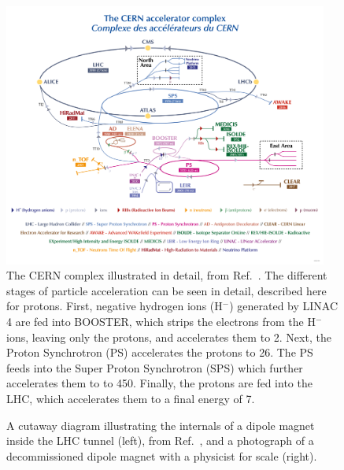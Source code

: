 \begin{figure}[!htb]
    \centering
    \includegraphics[width=0.95\textwidth]{fig/lhc/lhc_complex.png}
    \caption[The CERN complex illustrated in detail, from Ref.~\cite{Lopienska:2800984}]{
        The CERN complex illustrated in detail, from Ref.~\cite{Lopienska:2800984}. 
        The different stages of particle acceleration can be seen in detail, described here for protons. 
        First, negative hydrogen ions (H$^-$) generated by LINAC 4 are fed into BOOSTER, which strips the electrons from the H$^-$ ions, leaving only the protons, and accelerates them to 2\GeV. 
        Next, the Proton Synchrotron (PS) accelerates the protons to 26\GeV. 
        The PS feeds into the Super Proton Synchrotron (SPS) which further accelerates them to to 450\GeV. 
        Finally, the protons are fed into the LHC, which accelerates them to a final energy of 7\TeV. 
    }
    \label{fig:cern_complex}
\end{figure}

\begin{figure}[htb]
    \centering
    \quad
    \caption[A cutaway diagram illustrating the internals of a dipole magnet inside the LHC tunnel, from Ref.~\cite{Dominguez:1741036}, and a photograph of a decommissioned dipole magnet with a physicist for scale]{
        A cutaway diagram illustrating the internals of a dipole magnet inside the LHC tunnel (left), from Ref.~\cite{Dominguez:1741036}, and a photograph of a decommissioned dipole magnet with a physicist for scale (right).
    }
    \label{fig:lhc_dipole}
\end{figure}

